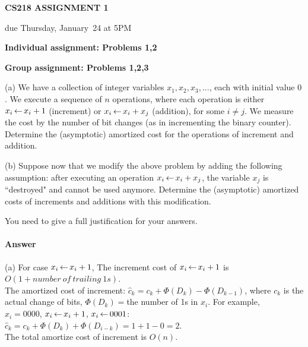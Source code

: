 \documentclass[11pt]{article}
\begin{document}
\centerline{\large \bf CS218 ASSIGNMENT 1}
\centerline{due Thursday, January~24 at 5PM}

\vskip 0.1in
\noindent
{\bf Individual assignment: Problems 1,2}

\noindent
{\bf Group assignment: Problems 1,2,3}

\vskip 0.1in


\begin{problem} 
(a)
We have a collection of integer variables $x_1,x_2,x_3, ...$,
each with initial value $0$.
We execute a sequence of $n$ operations, where each
operation is either $x_i {\,\leftarrow\,} x_i+1$ (increment)
or $x_i {\,\leftarrow\,} x_i + x_j$ (addition),
for some $i\neq j$. We measure the cost by the number of
bit changes (as in incrementing the binary counter).
Determine the (asymptotic) amortized cost for the operations
of increment and addition.

(b) 
Suppose now that we modify the above problem by adding the
following assumption: after executing an operation
$x_i {\,\leftarrow\,} x_i + x_j$, the variable $x_j$ is ``destroyed" and
cannot be used anymore.
Determine the (asymptotic) amortized costs of
increments and additions with this modification.

You need to give a full justification for your answers.
\end{problem}

\paragraph{Answer}
(a)
For case $x_i {\,\leftarrow\,} x_i+1$, 
The increment cost of $x_i {\,\leftarrow\,} x_i+1$ is $O(1 + number\: of\: trailing\: 1s)$.\\
The amortized cost of increment: $\hat c_k = c_k + \Phi(D_k) - \Phi(D_{k-1})$, where $c_k$ is the actual change of bits, $\Phi(D_k) = $the number of 1s in $x_i$. For example,\\
$x_i = 0000$, $x_i {\,\leftarrow\,} x_i + 1$, $x_i {\,\leftarrow\,} 0001$: $\hat c_k = c_k + \Phi(D_k) + \Phi(D_{i-k}) = 1 + 1 - 0 = 2$.\\
The total amortize cost of increment is $O(n).$
\end{document}

